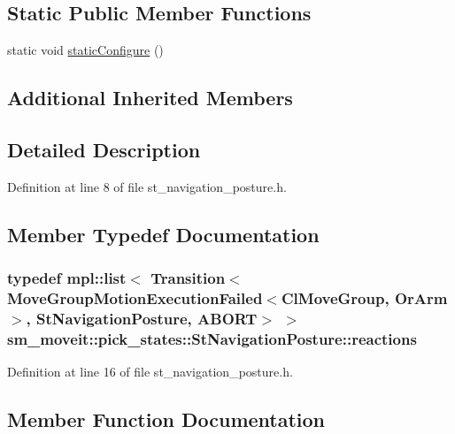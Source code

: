 \subsection*{Static Public Member Functions}
\begin{DoxyCompactItemize}
\item 
static void \hyperlink{structsm__moveit_1_1pick__states_1_1StNavigationPosture_a6d87dbbde4965e2f4c8606402c523a3d}{static\+Configure} ()
\end{DoxyCompactItemize}
\subsection*{Additional Inherited Members}


\subsection{Detailed Description}


Definition at line 8 of file st\+\_\+navigation\+\_\+posture.\+h.



\subsection{Member Typedef Documentation}
\subsubsection[{\texorpdfstring{reactions}{reactions}}]{\setlength{\rightskip}{0pt plus 5cm}typedef mpl\+::list$<$ Transition$<${\bf Move\+Group\+Motion\+Execution\+Failed}$<${\bf Cl\+Move\+Group}, {\bf Or\+Arm}$>$, {\bf St\+Navigation\+Posture}, {\bf A\+B\+O\+RT}$>$ $>$ {\bf sm\+\_\+moveit\+::pick\+\_\+states\+::\+St\+Navigation\+Posture\+::reactions}}\hypertarget{structsm__moveit_1_1pick__states_1_1StNavigationPosture_a4a54be576d30bc2cb4055730f0fad0c6}{}\label{structsm__moveit_1_1pick__states_1_1StNavigationPosture_a4a54be576d30bc2cb4055730f0fad0c6}


Definition at line 16 of file st\+\_\+navigation\+\_\+posture.\+h.



\subsection{Member Function Documentation}
